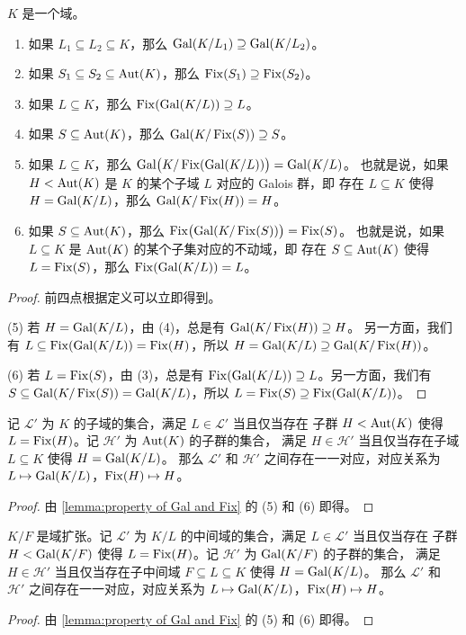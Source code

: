 \begin{lemma}\label{lemma:property of Gal and Fix}
  $K$ 是一个域。
  \begin{enumerate}
    \item 如果 $L_1\subseteq L_2\subseteq K$，那么 $\operatorname{Gal}(K/L_1)\supseteq\operatorname{Gal}(K/L_2)$。
    \item 如果 $S_1\subseteq S_2\subseteq\operatorname{Aut}(K)$，那么 $\operatorname{Fix}(S_1)\supseteq \operatorname{Fix}(S_2)$。
    \item 如果 $L\subseteq K$，那么 $\operatorname{Fix}(\operatorname{Gal}(K/L))\supseteq L$。
    \item 如果 $S\subseteq \operatorname{Aut}(K)$，那么 $\operatorname{Gal}(K/\operatorname{Fix}(S))\supseteq S$。
    \item 如果 $L\subseteq K$，那么 $\operatorname{Gal}\bigl(K/\operatorname{Fix}(\operatorname{Gal}(K/L))\bigr)=\operatorname{Gal}(K/L)$。
    也就是说，如果 $H<\operatorname{Aut}(K)$ 是 $K$ 的某个子域 $L$ 对应的 Galois 群，即
    存在 $L\subseteq K$ 使得 $H=\operatorname{Gal}(K/L)$，那么 $\operatorname{Gal}(K/\operatorname{Fix}(H))=H$。
    \item 如果 $S\subseteq\operatorname{Aut}(K)$，那么 $\operatorname{Fix}\bigl(\operatorname{Gal}(K/\operatorname{Fix}(S))\bigr)=\operatorname{Fix}(S)$。
    也就是说，如果 $L\subseteq K$ 是 $\operatorname{Aut}(K)$ 的某个子集对应的不动域，即
    存在 $S\subseteq \operatorname{Aut}(K)$ 使得 $L=\operatorname{Fix}(S)$，那么 $\operatorname{Fix}(\operatorname{Gal}(K/L))=L$。
  \end{enumerate}
\end{lemma}
\begin{proof}
  前四点根据定义可以立即得到。
  
  (5) 若 $H=\operatorname{Gal}(K/L)$，由 (4)，总是有 $\operatorname{Gal}(K/\operatorname{Fix}(H))\supseteq H$。
  另一方面，我们有 $L\subseteq \operatorname{Fix}(\operatorname{Gal}(K/L))=\operatorname{Fix}(H)$，所以 $H=\operatorname{Gal}(K/L)\supseteq \operatorname{Gal}(K/\operatorname{Fix}(H))$。

  (6) 若 $L=\operatorname{Fix}(S)$，由 (3)，总是有 $\operatorname{Fix}(\operatorname{Gal}(K/L))\supseteq L$。另一方面，我们有
  $S\subseteq \operatorname{Gal}(K/\operatorname{Fix}(S))=\operatorname{Gal}(K/L)$，所以 $L=\operatorname{Fix}(S)\supseteq\operatorname{Fix}(\operatorname{Gal}(K/L))$。
\end{proof}

\begin{corollary}
  记 $\mathcal{L}'$ 为 $K$ 的子域的集合，满足 $L\in\mathcal{L}'$ 当且仅当存在
  子群 $H<\operatorname{Aut}(K)$ 使得 $L=\operatorname{Fix}(H)$。记 $\mathcal{H}'$ 为 $\operatorname{Aut}(K)$ 的子群的集合，
  满足 $H\in\mathcal{H}'$ 当且仅当存在子域 $L\subseteq K$ 使得 $H=\operatorname{Gal}(K/L)$。
  那么 $\mathcal{L}'$ 和 $\mathcal{H}'$ 之间存在一一对应，对应关系为
  $L\mapsto \operatorname{Gal}(K/L)$，$\operatorname{Fix}(H)\mapsto H$。
\end{corollary}
\begin{proof}
  由 \autoref{lemma:property of Gal and Fix} 的 (5) 和 (6) 即得。
\end{proof}

\begin{corollary}\label{coro:corresponce of Gal and Fix}
  $K/F$ 是域扩张。记 $\mathcal{L}'$ 为 $K/L$ 的中间域的集合，满足 $L\in\mathcal{L}'$ 当且仅当存在
  子群 $H<\operatorname{Gal}(K/F)$ 使得 $L=\operatorname{Fix}(H)$。记 $\mathcal{H}'$ 为 $\operatorname{Gal}(K/F)$ 的子群的集合，
  满足 $H\in\mathcal{H}'$ 当且仅当存在子中间域 $F\subseteq L\subseteq K$ 使得 $H=\operatorname{Gal}(K/L)$。
  那么 $\mathcal{L}'$ 和 $\mathcal{H}'$ 之间存在一一对应，对应关系为
  $L\mapsto \operatorname{Gal}(K/L)$，$\operatorname{Fix}(H)\mapsto H$。
\end{corollary}
\begin{proof}
  由 \autoref{lemma:property of Gal and Fix} 的 (5) 和 (6) 即得。
\end{proof}

